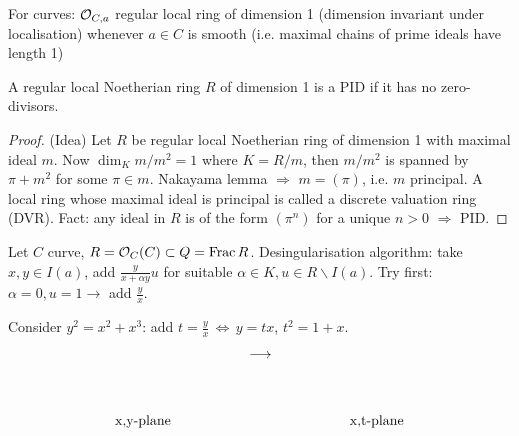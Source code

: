 \documentclass[a4paper,11pt]{article}
\begin{document}
{				For curves: $\mathcal{O}_{C,a}$ regular local ring of dimension 1 (dimension invariant under localisation) whenever $a\in C$ is smooth (i.e. maximal chains of prime ideals have length 1)

				\begin{prop}
					A regular local Noetherian ring $R$ of dimension 1 is a PID if it has no zero-divisors. 
				\end{prop}
				\begin{proof}\renewcommand{\qedsymbol}{}(Idea)
					Let $R$ be regular local Noetherian ring of dimension 1 with maximal ideal $m$. Now $\dim_Km/m^2=1$ where $K=R/m$, then $m/m^2$ is spanned by $\pi+m^2$ for some $\pi\in m$. Nakayama lemma $\Longrightarrow$ $m=(\pi)$, i.e. $m$ principal. A local ring whose maximal ideal is principal is called a discrete valuation ring (DVR). Fact: any ideal in $R$ is of the form $(\pi^n)$ for a unique $n>0$ $\Longrightarrow$ PID.
				\end{proof}\renewcommand{\qedsymbol}{$\square$}

				Let $C$ curve, $R=\mathcal{O}_C(C)\subset Q=\operatorname{Frac} R$. Desingularisation algorithm: take $x,y\in I(a)$, add $\frac{y}{x+\alpha y}u$ for suitable $\alpha\in K,u\in R\backslash I(a)$. Try first: $\alpha=0,u=1\longrightarrow$ add $\frac{y}{x}$.

				\begin{eg}
					Consider $y^2=x^2+x^3$: add $t=\frac{y}{x}\,\Longleftrightarrow\,y=tx$, $t^2=1+x$.
					\begin{equation*}
						\tikz[scale=1,baseline=-.1cm]{\node at (0,-1.7){x,y\text{-plane}};\draw[thick,black]plot[smooth] file {plots/cubic1.table};\draw[thick,black]plot[smooth] file {plots/cubic2.table}}\hspace{5em}\longrightarrow\hspace{5em}\tikz[scale=1,baseline=-.1cm]{\node at (.5,-1.7){x,t\text{-plane}};\draw[thick,black]plot[smooth] file {plots/para1.table};\draw[thick,black]plot[smooth] file {plots/para2.table}}
					\end{equation*}
				\end{eg}

}
\end{document}
